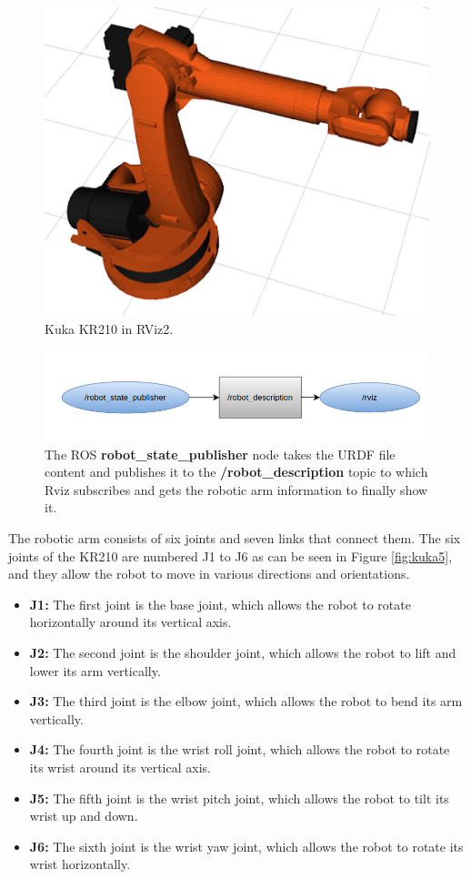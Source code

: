\documentclass[12pt,oneside]{article}
\begin{document}
\begin{figure}[H]
	\centering
	\includegraphics[width=0.7\linewidth]{kuka1}
	\caption[Rviz2 kuka]{Kuka KR210 in RViz2.}
	\label{fig:kuka1}
\end{figure}

\begin{figure}[H]
\centering
\includegraphics[width=0.9\linewidth]{rosgraph1}
\caption[The robot\_state\_publisher node]{The ROS \textbf{robot\_state\_publisher} node takes the URDF file content and publishes it to the \textbf{/robot\_description} topic to which Rviz subscribes and gets the robotic arm information to finally show it.}
\label{fig:rosgraph1}
\end{figure}

The robotic arm consists of six joints and seven links that connect them. The six joints of the KR210 are numbered J1 to J6 as can be seen in Figure \ref{fig:kuka5}, and they allow the robot to move in various directions and orientations.
\begin{itemize}
	\item \textbf{J1:} The first joint is the base joint, which allows the robot to rotate horizontally around its vertical axis.
	
	\item \textbf{J2:} The second joint is the shoulder joint, which allows the robot to lift and lower its arm vertically.
	
	\item \textbf{J3:} The third joint is the elbow joint, which allows the robot to bend its arm vertically.
	
	\item \textbf{J4:} The fourth joint is the wrist roll joint, which allows the robot to rotate its wrist around its vertical axis.
	
	\item \textbf{J5:} The fifth joint is the wrist pitch joint, which allows the robot to tilt its wrist up and down.
	
	\item \textbf{J6:} The sixth joint is the wrist yaw joint, which allows the robot to rotate its wrist horizontally.	 
\end{itemize}
\end{document}
